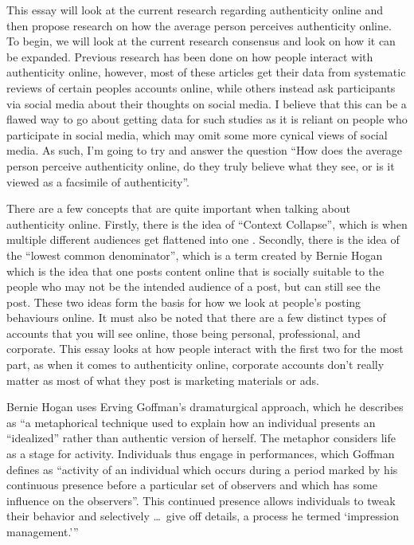 \documentclass[12pt]{article}
\begin{document}
\begin{doublespace}
\vspace*{20pt}


    This essay will look at the current research regarding authenticity online and then propose research on how the average person perceives authenticity online. 
    To begin, we will look at the current research consensus and look on how it can be expanded.  
    Previous research has been done on how people interact with authenticity online, however, most of these articles get their data from systematic reviews of certain peoples accounts online, 
    while others instead ask participants via social media about their thoughts on social media. 
    I believe that this can be a flawed way to go about getting data for such studies as it is reliant on people who participate in social media, which may omit some more cynical views of social media. 
    As such, I'm going to try and answer the question ``How does the average person perceive authenticity online, do they truly believe what they see, or is it viewed as a facsimile of authenticity''. 
\par There are a few concepts that are quite important when talking about authenticity online. 
    Firstly, there is the idea of ``Context Collapse'', which is when multiple different audiences get flattened into one \autocite[122]{MB1}.
    Secondly, there is the idea of the ``lowest common denominator'', which is a term created by Bernie Hogan which is the idea that one posts content online that is socially suitable to the people who may not be the intended audience of a post, but can still see the post. \Autocite*[383]{Hogan1}
    These two ideas form the basis for how we look at people's posting behaviours online. It must also be noted that there are a few distinct types of accounts that you will see online, those being personal, professional, and corporate. This essay looks at how people interact with the first two for the most part, as when it comes to authenticity online, corporate accounts don't really matter as most of what they post is marketing materials or ads.
    \par Bernie Hogan uses Erving Goffman's dramaturgical approach, which he describes as ``a metaphorical technique used to explain how an individual presents an ``idealized'' rather than authentic version of herself. The metaphor considers life as a stage for activity. Individuals thus engage in performances, which Goffman defines as ``activity of an individual which occurs during a period marked by his continuous presence before a particular set of observers and which has some influence on the observers''\autocite[22]{Goffman}. This continued presence allows individuals to tweak their behavior and selectively \dots \ give off details, a process he termed `impression management.'''\autocite[378]{Hogan1}

\end{doublespace}
\end{document}
